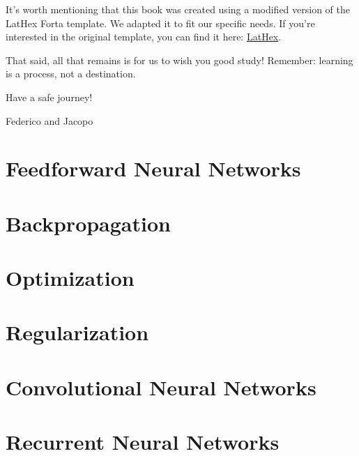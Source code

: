\documentclass[11pt,fleqn,oneside]{book} %
\begin{document}
It's worth mentioning that this book was created using a modified version of the LatHex Forta template. We adapted it to fit our specific needs. If you're interested in the original template, you can find it here: \href{https://github.com/apehex/lathex-template}{LatHex}. 


That said, all that remains is for us to wish you good study! Remember: learning is a process, not a destination. 

Have a safe journey!

\hfill Federico and Jacopo
\newpage
\tableofcontents


\newpage
\chapter{Feedforward Neural Networks} 


\newpage
\chapter{Backpropagation} 


\newpage
\chapter{Optimization}


\newpage
\chapter{Regularization}


\newpage
\chapter{Convolutional Neural Networks}


\newpage
\chapter{Recurrent Neural Networks}

\end{document}

